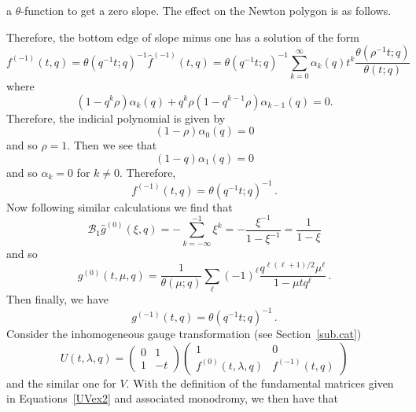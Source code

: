 \documentclass[12pt,reqno]{amsart}
\theoremstyle{definition}
\def\be{\begin{equation}}
\def\ee{\end{equation}}
\def\Bor{\mathcal{B}}
\def\rind{\rho}
\begin{document}
a $\theta$-function to get a zero slope. The effect on the Newton polygon is as
follows.
\begin{center}
\end{center}
Therefore, the bottom edge of slope minus one has a solution of the form
\be
f^{(-1)}(t,q)
=
\theta(q^{-1}t;q)^{-1}\hat{f}^{(-1)}(t,q)
=
\theta(q^{-1}t;q)^{-1}\sum_{k=0}^{\infty}\alpha_{k}(q)t^{k}
\frac{\theta(\rind^{-1}t;q)}{\theta(t;q)}
\ee
where
\be
(1-q^{k}\rind)\alpha_{k}(q)+q^{k}\rind(1-q^{k-1}\rind)\alpha_{k-1}(q)=0.
\ee
Therefore, the indicial polynomial is given by
\be
(1-\rind)\alpha_{0}(q)=0
\ee
and so $\rind=1$. Then we see that
\be
(1-q)\alpha_{1}(q)=0
\ee
and so $\alpha_{k}=0$ for $k\neq 0$. Therefore,
\be
\label{ex2.f-1}
f^{(-1)}(t,q)=\theta(q^{-1}t;q)^{-1}\,.
\ee
Now following similar calculations we find that
\be
\Bor_{1}\hat{g}^{(0)}(\xi,q)
=
-\sum_{k=-\infty}^{-1}\xi^{k}
=
-\frac{\xi^{-1}}{1-\xi^{-1}}
=
\frac{1}{1-\xi}
\ee
and so
\be
\label{ex2.g0}
g^{(0)}(t,\mu ,q)
=
\frac{1}{\theta(\mu ;q)}\sum_{\ell}(-1)^{\ell}
\frac{q^{\ell(\ell+1)/2}\mu ^{\ell}}{1-\mu tq^{\ell}} \,.
\ee
Then finally, we have
\be
\label{ex2.g1}
g^{(-1)}(t,q)=\theta(q^{-1}t;q)^{-1} \,.
\ee
Consider the inhomogeneous gauge transformation (see Section~\ref{sub.cat})
\be
U(t,\lambda,q)
=
\begin{pmatrix}
  0 & 1\\
  1 & -t
\end{pmatrix}
\begin{pmatrix}
  1 & 0\\
  f^{(0)}(t,\lambda,q) & f^{(-1)}(t,q)
\end{pmatrix}
\ee
and the similar one for $V$. With the definition of the fundamental matrices
given in Equations~\eqref{UVex2} and associated monodromy, we then have that
\end{document}
